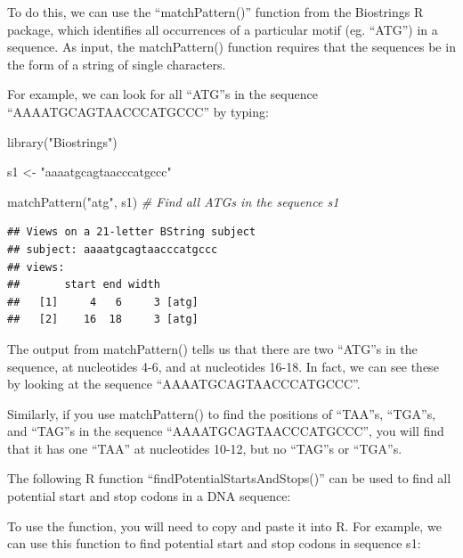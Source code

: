 \documentclass[
]{book}
\newenvironment{Shaded}{\begin{snugshade}}{\end{snugshade}}
\newcommand{\CommentTok}[1]{\textcolor[rgb]{0.56,0.35,0.01}{\textit{#1}}}
\newcommand{\FunctionTok}[1]{\textcolor[rgb]{0.00,0.00,0.00}{#1}}
\newcommand{\NormalTok}[1]{#1}
\newcommand{\OtherTok}[1]{\textcolor[rgb]{0.56,0.35,0.01}{#1}}
\newcommand{\StringTok}[1]{\textcolor[rgb]{0.31,0.60,0.02}{#1}}
\begin{document}
To do this, we can use the ``matchPattern()'' function from the Biostrings R package, which identifies all occurrences of a particular motif (eg. ``ATG'') in a sequence. As input, the matchPattern() function requires that the sequences be in the form of a string of single characters.

For example, we can look for all ``ATG''s in the sequence ``AAAATGCAGTAACCCATGCCC'' by typing:

\begin{Shaded}
\begin{Highlighting}[]
\FunctionTok{library}\NormalTok{(}\StringTok{"Biostrings"}\NormalTok{)}
\end{Highlighting}
\end{Shaded}

\begin{Shaded}
\begin{Highlighting}[]
\NormalTok{s1 }\OtherTok{\textless{}{-}} \StringTok{"aaaatgcagtaacccatgccc"}
\end{Highlighting}
\end{Shaded}

\begin{Shaded}
\begin{Highlighting}[]
\FunctionTok{matchPattern}\NormalTok{(}\StringTok{"atg"}\NormalTok{, s1) }\CommentTok{\# Find all ATGs in the sequence s1}
\end{Highlighting}
\end{Shaded}

\begin{verbatim}
## Views on a 21-letter BString subject
## subject: aaaatgcagtaacccatgccc
## views:
##       start end width
##   [1]     4   6     3 [atg]
##   [2]    16  18     3 [atg]
\end{verbatim}

The output from matchPattern() tells us that there are two ``ATG''s in the sequence, at nucleotides 4-6, and at nucleotides 16-18. In fact, we can see these by looking at the sequence ``AAAATGCAGTAACCCATGCCC''.

Similarly, if you use matchPattern() to find the positions of ``TAA''s, ``TGA''s, and ``TAG''s in the sequence ``AAAATGCAGTAACCCATGCCC'', you will find that it has one ``TAA'' at nucleotides 10-12, but no ``TAG''s or ``TGA''s.

The following R function ``findPotentialStartsAndStops()'' can be used to find all potential start and stop codons in a DNA sequence:

To use the function, you will need to copy and paste it into R. For example, we can use this function to find potential start and stop codons in sequence s1:
\end{document}
